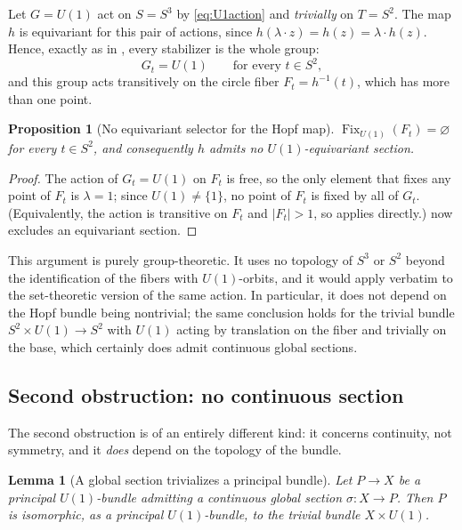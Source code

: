 \documentclass[11pt,reqno]{amsart}
\theoremstyle{plain}
\newtheorem{proposition}[theorem]{Proposition}
\newtheorem{lemma}[theorem]{Lemma}
\theoremstyle{definition}
\theoremstyle{remark}
\DeclareMathOperator{\Fix}{Fix}
\begin{document}
Let $G=U(1)$ act on $S=S^{3}$ by \eqref{eq:U1action} and \emph{trivially} on $T=S^{2}$. The map $h$ is equivariant for this pair of actions, since $h(\lambda\cdot z)=h(z)=\lambda\cdot h(z)$. Hence, exactly as in , every stabilizer is the whole group:
\begin{equation}
\label{eq:hopfstab}
G_{t}=U(1)
\qquad\text{for every }t\in S^{2},
\end{equation}
and this group acts transitively on the circle fiber $F_{t}=h^{-1}(t)$, which has more than one point.

\begin{proposition}[No equivariant selector for the Hopf map]
\label{prop:hopfequiv}
$\Fix_{U(1)}(F_{t})=\varnothing$ for every $t\in S^{2}$, and consequently $h$ admits no $U(1)$-equivariant section.
\end{proposition}

\begin{proof}
The action of $G_{t}=U(1)$ on $F_{t}$ is free, so the only element that fixes any point of $F_{t}$ is $\lambda=1$; since $U(1)\neq\{1\}$, no point of $F_{t}$ is fixed by all of $G_{t}$. (Equivalently, the action is transitive on $F_{t}$ and $|F_{t}|>1$, so  applies directly.)  now excludes an equivariant section.
\end{proof}

This argument is purely group-theoretic. It uses no topology of $S^{3}$ or $S^{2}$ beyond the identification of the fibers with $U(1)$-orbits, and it would apply verbatim to the set-theoretic version of the same action. In particular, it does not depend on the Hopf bundle being nontrivial; the same conclusion holds for the trivial bundle $S^{2}\times U(1)\to S^{2}$ with $U(1)$ acting by translation on the fiber and trivially on the base, which certainly does admit continuous global sections.

\subsection{Second obstruction: no continuous section}

The second obstruction is of an entirely different kind: it concerns continuity, not symmetry, and it \emph{does} depend on the topology of the bundle.

\begin{lemma}[A global section trivializes a principal bundle]
\label{lem:trivialize}
Let $P\to X$ be a principal $U(1)$-bundle admitting a continuous global section $\sigma\colon X\to P$. Then $P$ is isomorphic, as a principal $U(1)$-bundle, to the trivial bundle $X\times U(1)$.
\end{lemma}
\end{document}
